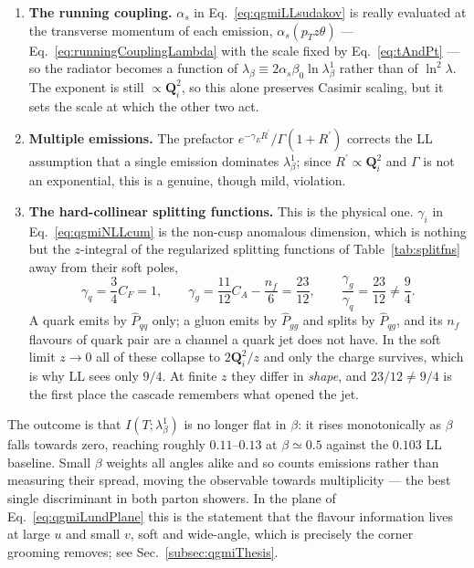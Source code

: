 \begin{enumerate}
	\item \textbf{The running coupling.} \(\alpha_s\) in Eq.~\ref{eq:qgmiLLsudakov} is
	really evaluated at the transverse momentum of each emission,
	\(\alpha_s(p_Tz\theta)\) --- Eq.~\ref{eq:runningCouplingLambda} with the scale
	fixed by Eq.~\ref{eq:tAndPt} --- so the radiator becomes a function of
	\(\lambda_\beta\equiv2\alpha_s\beta_0\ln\lambda^1_\beta\) rather than of
	\(\ln^2\lambda\). The exponent is still \(\propto\mathbf{Q}_i^2\), so this alone
	preserves Casimir scaling, but it sets the scale at which the other two act.

	\item \textbf{Multiple emissions.} The prefactor
	\(e^{-\gamma_ER^\prime}/\Gamma(1+R^\prime)\) corrects the LL assumption that a
	single emission dominates \(\lambda^1_\beta\); since
	\(R^\prime\propto\mathbf{Q}_i^2\) and \(\Gamma\) is not an exponential, this is a
	genuine, though mild, violation.

	\item \textbf{The hard-collinear splitting functions.} This is the physical one.
	\(\gamma_i\) in Eq.~\ref{eq:qgmiNLLcum} is the non-cusp anomalous dimension, which
	is nothing but the \(z\)-integral of the regularized splitting functions of
	Table~\ref{tab:splitfns} away from their soft poles,
	\begin{equation}
		\gamma_q = \frac{3}{4}C_F = 1 ,
		\qquad
		\gamma_g = \frac{11}{12}C_A - \frac{n_f}{6} = \frac{23}{12} ,
		\qquad
		\frac{\gamma_g}{\gamma_q} = \frac{23}{12} \neq \frac{9}{4} .
		\label{eq:qgmiNonCusp}
	\end{equation}
	A quark emits by \(\hat{P}_{qq}\) only; a gluon emits by \(\hat{P}_{gg}\) and
	splits by \(\hat{P}_{qg}\), and its \(n_f\) flavours of quark pair are a channel a
	quark jet does not have. In the soft limit \(z\to0\) all of these collapse to
	\(2\mathbf{Q}_i^2/z\) and only the charge survives, which is why LL sees only
	\(9/4\). At finite \(z\) they differ in \emph{shape}, and
	\(23/12\neq9/4\) is the first place the cascade remembers what opened the jet.
\end{enumerate}

The outcome is that \(I(T;\lambda^1_\beta)\) is no longer flat in \(\beta\): it rises
monotonically as \(\beta\) falls towards zero, reaching roughly \(0.11\)--\(0.13\) at
\(\beta\simeq0.5\) against the \(0.103\) LL baseline. Small \(\beta\) weights all
angles alike and so counts emissions rather than measuring their spread, moving the
observable towards multiplicity --- the best single discriminant in both parton
showers. In the plane of Eq.~\ref{eq:qgmiLundPlane} this is the statement that the
flavour information lives at large \(u\) and small \(v\), soft and wide-angle, which
is precisely the corner grooming removes; see Sec.~\ref{subsec:qgmiThesis}.

